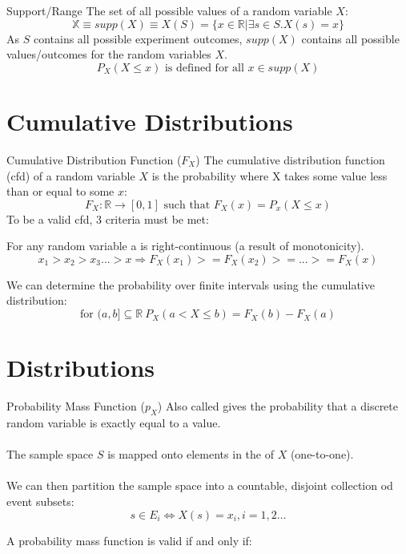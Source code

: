 \begin{definitionbox}{Support/Range}
	The set of all possible values of a random variable $X$:
	\[\mathbb{X} \equiv supp(X) \equiv X(S) = \{x \in \mathbb{R} | \exists s \in S . X(s) = x\}\]
	As $S$ contains all possible experiment outcomes, $supp(X)$ contains all possible values/outcomes for the random variables $X$.
	\[P_X(X \leq x) \text{ is defined for all } x \in supp(X)\]
\end{definitionbox}

\section{Cumulative Distributions}
\begin{definitionbox}{Cumulative Distribution Function ($F_X$)}
	The cumulative distribution function (cfd) of a random variable $X$ is the probability where X takes some value less than or equal to some $x$:
	\[F_X : \mathbb{R} \to [0,1] \text{ such that } F_X(x) = P_x(X \leq x)\]
	To be a valid cfd, 3 criteria must be met:
	\begin{enumerate}
    \end{enumerate}
	For any random variable a  is right-continuous (a result of monotonicity).
	\[x_1 > x_2 > x_3 ... > x \Rightarrow F_X(x_1) >= F_X(x_2) >= ... >= F_X(x)\]
\end{definitionbox}

We can determine the probability over finite intervals using the cumulative distribution:
\[\text{for } (a,b] \subseteq \mathbb{R} \ P_X(a < X \leq b) = F_X(b) - F_X(a)\]

\section*{Distributions}

\begin{definitionbox}{Probability Mass Function ($p_X$)}
	Also called  gives the probability that a discrete random variable is exactly equal to a value.
	\\
	\\ The sample space $S$ is mapped onto elements in the  of $X$ (one-to-one).
	\\
	\\ We can then partition the sample space into a countable, disjoint collection od event subsets:
	\[s \in E_i \Leftrightarrow X(s) = x_i, i = 1,2 \dots\]

	A probability mass function is valid if and only if:
	\begin{enumerate}
    \end{enumerate}
\end{definitionbox}

